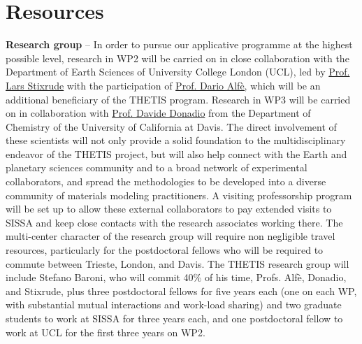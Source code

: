 \salta
\section{Resources}

\textbf{Research group} -- In order to pursue our applicative programme at the highest possible level, research in WP2 will be carried on in close collaboration with the Department of Earth Sciences of University College London (UCL), led by \href{http://www.ucl.ac.uk/EarthSci/people/stixrude/}{Prof. Lars Stixrude} with the participation of \href{http://www.homepages.ucl.ac.uk/~ucfbdxa/CV.pdf}{Prof. Dario Alf\`e,} which will be an additional beneficiary of the THETIS program. Research in WP3 will be carried on in collaboration with \href{http://chemistry.ucdavis.edu/faculty/department_faculty/davide_donadio.html}{Prof. Davide Donadio} from the Department of Chemistry of the University of California at Davis. The direct involvement of these scientists will not only provide a solid foundation to the multidisciplinary endeavor of the THETIS project, but will also help connect with the Earth and planetary sciences community and to a broad network of experimental collaborators, and spread the methodologies to be developed into a diverse community of materials modeling practitioners. A visiting professorship program will be set up to allow these external collaborators to pay extended visits to SISSA and keep close contacts with the research associates working there. The multi-center character of the research group will require non negligible travel resources, particularly for the postdoctoral fellows who will be required to commute between Trieste, London, and Davis. The THETIS research group will include Stefano Baroni, who will commit 40\% of his time, Profs. Alfè, Donadio, and Stixrude, plus three postdoctoral fellows for five years each (one on each WP, with substantial mutual interactions and work-load sharing) and two graduate students to work at SISSA for three years each, and one postdoctoral fellow to work at UCL for the first three years on WP2.

